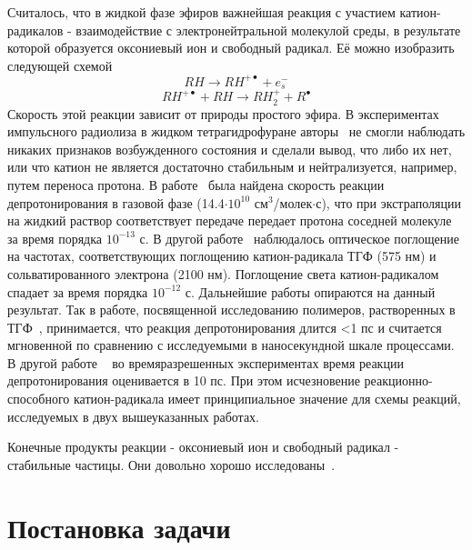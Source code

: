 \documentclass[14pt,titlepage]{extarticle}
\let\oldsection\section
\renewcommand{\section}{\newpage\oldsection}
\newcommand{\oldsectionwithoutnumber}[1]{
  \oldsection*{#1}
  \addcontentsline{toc}{section}{#1}
}
\begin{document}
Считалось, что в жидкой фазе эфиров важнейшая реакция с участием катион-радикалов - взаимодействие с электронейтральной молекулой среды, в результате которой образуется оксониевый ион и свободный радикал. Её можно изобразить следующей схемой
\begin{equation} RH \rightarrow RH^{+\bullet} + e_{s}^{-}\tag{ионизация} \end{equation}
\begin{equation} RH^{+\bullet}+RH\rightarrow RH_2^++R^{\bullet} \tag{депротонирование} \end{equation}
Скорость этой реакции зависит от природы простого эфира. В экспериментах импульсного радиолиза в жидком тетрагидрофуране авторы~\cite{Baxendale19693} не смогли наблюдать никаких признаков возбужденного состояния и сделали вывод, что либо их нет, или что катион не является достаточно стабильным и нейтрализуется, например, путем переноса протона. В работе~\cite{Ausloos198497} была найдена скорость реакции депротонирования в газовой фазе (14.4\( \cdot 10^{10}\) см\(^3\)/молек\(\cdot\)с), что при экстраполяции на жидкий раствор соответствует передаче передает протона соседней молекуле за время порядка \( 10^{-13} \) с. В другой работе~\cite{martini} наблюдалось оптическое поглощение на частотах, соответствующих поглощению катион-радикала ТГФ (575 нм) и сольватированного электрона (2100 нм). Поглощение света катион-радикалом спадает за время порядка \(10^{-12} \) с. Дальнейшие работы опираются на данный результат.
Так в работе, посвященной исследованию полимеров, растворенных в ТГФ~\cite{doi:10.1021/jp809413x}, принимается, что реакция депротонирования длится <1 пс и считается мгновенной по сравнению с исследуемыми в наносекундной шкале процессами. В другой работе ~\cite{doi:10.1021/ja062596h} во времяразрешенных экспериментах время реакции депротонирования оценивается в 10 пс. При этом исчезновение реакционно-способного катион-радикала имеет принципиальное значение для схемы реакций, исследуемых в двух вышеуказанных работах.

Конечные продукты реакции - оксониевый ион и свободный радикал - стабильные частицы. Они довольно хорошо исследованы~\cite{springerlink:10.1023/A:1011978921902}.
\oldsectionwithoutnumber{Постановка задачи}
\end{document}
